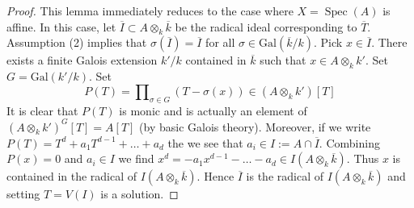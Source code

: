 \documentclass[10pt,a4paper]{amsart}
\theoremstyle{plain}
\theoremstyle{definition}
\theoremstyle{remark}
\numberwithin{equation}{subsection}
\def\Spec{\mathop{\mathrm{Spec}}}
\begin{document}
\begin{proof}
This lemma immediately reduces to the case where $X = \Spec(A)$
is affine. In this case, let $\overline{I} \subset A \otimes_k \overline{k}$
be the radical ideal corresponding to $\overline{T}$.
Assumption (2) implies that $\sigma(\overline{I}) = \overline{I}$
for all $\sigma \in \text{Gal}(\overline{k}/k)$.
Pick $x \in \overline{I}$. There exists a finite Galois extension
$k'/k$ contained in $\overline{k}$ such that $x \in A \otimes_k k'$.
Set $G = \text{Gal}(k'/k)$. Set
$$
P(T) = \prod\nolimits_{\sigma \in G} (T - \sigma(x)) \in (A \otimes_k k')[T]
$$
It is clear that $P(T)$ is monic and is actually an element of
$(A \otimes_k k')^G[T] = A[T]$ (by basic Galois theory).
Moreover, if we write $P(T) = T^d + a_1T^{d - 1} + \ldots + a_d$
the we see that $a_i \in I := A \cap \overline{I}$.
Combining $P(x) = 0$ and $a_i \in I$ we find
$x^d = - a_1 x^{d - 1} - \ldots  - a_d \in I(A \otimes_k \overline{k})$.
Thus $x$ is contained in the radical of $I(A \otimes_k \overline{k})$.
Hence $\overline{I}$ is the radical of $I(A \otimes_k \overline{k})$ and
setting $T = V(I)$ is a solution.
\end{proof}
\end{document}
